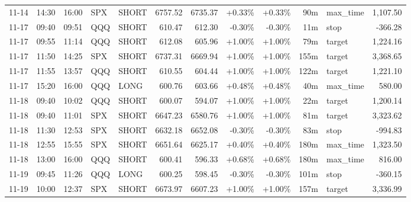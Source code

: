 \documentclass[11pt,a4paper,twoside]{article}
\begin{document}
\begin{center}
\begin{longtable}{>{\color{txtmain}}l l l l l r r r r r >{\color{txtmain}}l r}
11-14 & 14:30 & 16:00 & SPX & SHORT & 6757.52 & 6735.37 & \textcolor{wingreen}{+0.33\%} & \textcolor{wingreen}{+0.33\%} & 90m & max\_time & \textcolor{wingreen}{1,107.50} \\
11-17 & 09:40 & 09:51 & QQQ & SHORT & 610.47 & 612.30 & \textcolor{lossred}{-0.30\%} & \textcolor{lossred}{-0.30\%} & 11m & stop & \textcolor{lossred}{-366.28} \\
11-17 & 09:55 & 11:14 & QQQ & SHORT & 612.08 & 605.96 & \textcolor{wingreen}{+1.00\%} & \textcolor{wingreen}{+1.00\%} & 79m & target & \textcolor{wingreen}{1,224.16} \\
11-17 & 11:50 & 14:25 & SPX & SHORT & 6737.31 & 6669.94 & \textcolor{wingreen}{+1.00\%} & \textcolor{wingreen}{+1.00\%} & 155m & target & \textcolor{wingreen}{3,368.65} \\
11-17 & 11:55 & 13:57 & QQQ & SHORT & 610.55 & 604.44 & \textcolor{wingreen}{+1.00\%} & \textcolor{wingreen}{+1.00\%} & 122m & target & \textcolor{wingreen}{1,221.10} \\
11-17 & 15:20 & 16:00 & QQQ & LONG & 600.76 & 603.66 & \textcolor{wingreen}{+0.48\%} & \textcolor{wingreen}{+0.48\%} & 40m & max\_time & \textcolor{wingreen}{580.00} \\
11-18 & 09:40 & 10:02 & QQQ & SHORT & 600.07 & 594.07 & \textcolor{wingreen}{+1.00\%} & \textcolor{wingreen}{+1.00\%} & 22m & target & \textcolor{wingreen}{1,200.14} \\
11-18 & 09:40 & 11:01 & SPX & SHORT & 6647.23 & 6580.76 & \textcolor{wingreen}{+1.00\%} & \textcolor{wingreen}{+1.00\%} & 81m & target & \textcolor{wingreen}{3,323.62} \\
11-18 & 11:30 & 12:53 & SPX & SHORT & 6632.18 & 6652.08 & \textcolor{lossred}{-0.30\%} & \textcolor{lossred}{-0.30\%} & 83m & stop & \textcolor{lossred}{-994.83} \\
11-18 & 12:55 & 15:55 & SPX & SHORT & 6651.64 & 6625.17 & \textcolor{wingreen}{+0.40\%} & \textcolor{wingreen}{+0.40\%} & 180m & max\_time & \textcolor{wingreen}{1,323.50} \\
11-18 & 13:00 & 16:00 & QQQ & SHORT & 600.41 & 596.33 & \textcolor{wingreen}{+0.68\%} & \textcolor{wingreen}{+0.68\%} & 180m & max\_time & \textcolor{wingreen}{816.00} \\
11-19 & 09:45 & 11:26 & QQQ & LONG & 600.25 & 598.45 & \textcolor{lossred}{-0.30\%} & \textcolor{lossred}{-0.30\%} & 101m & stop & \textcolor{lossred}{-360.15} \\
11-19 & 10:00 & 12:37 & SPX & SHORT & 6673.97 & 6607.23 & \textcolor{wingreen}{+1.00\%} & \textcolor{wingreen}{+1.00\%} & 157m & target & \textcolor{wingreen}{3,336.99} \\

\end{longtable}
\end{center}
\end{document}
